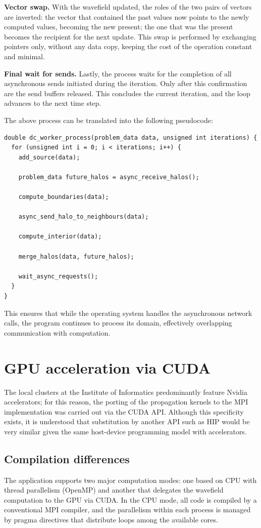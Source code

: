 \documentclass[cic,tc,english]{infufrgs}
\begin{document}
\textbf{Vector swap.}
With the wavefield updated, the roles of the two pairs of vectors are
inverted: the vector that contained the past values now points to the
newly computed values, becoming the new present; the one that was the
present becomes the recipient for the next update. This swap is
performed by exchanging pointers only, without any data copy, keeping
the cost of the operation constant and minimal.

\textbf{Final wait for sends.}
Lastly, the process waits for the completion of all asynchronous sends
initiated during the iteration. Only after this confirmation are the
send buffers released. This concludes the current iteration, and the
loop advances to the next time step.

The above process can be translated into the following pseudocode:
\begin{lstlisting}[style=CStyle, caption = {Main worker loop using Ghost Cells}]
double dc_worker_process(problem_data data, unsigned int iterations) {
  for (unsigned int i = 0; i < iterations; i++) {
    add_source(data);

    problem_data future_halos = async_receive_halos();

    compute_boundaries(data);

    async_send_halo_to_neighbours(data);

    compute_interior(data);

    merge_halos(data, future_halos);

    wait_async_requests();
  }
}
\end{lstlisting}

This ensures that while the operating system handles the asynchronous
network calls, the program continues to process its domain, effectively
overlapping communication with computation.

\section{GPU acceleration via CUDA}
\label{sec:gpu_cuda}
The local clusters at the Institute of Informatics predominantly
feature Nvidia accelerators; for this reason, the porting of the
propagation kernels to the MPI implementation was carried out via the
CUDA API. Although this specificity exists, it is understood that
substitution by another API such as HIP would be very similar given the
same host-device programming model with accelerators.

\subsection{Compilation differences}
The application supports two major computation modes: one based on CPU
with thread parallelism (OpenMP) and another that delegates the
wavefield computation to the GPU via CUDA. In the CPU mode, all code
is compiled by a conventional MPI compiler, and the parallelism within
each process is managed by pragma directives that distribute loops
among the available cores.
\end{document}
